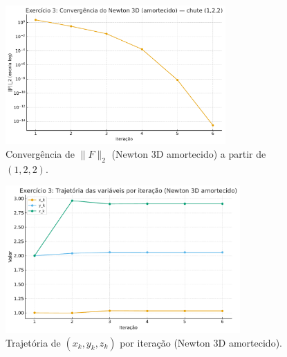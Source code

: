 \documentclass[12pt,a4paper]{article}
\begin{document}
\begin{figure}[H]
  \centering
  \includegraphics[width=0.75\textwidth]{figures/ex3_convergence_normF.pdf}
  \caption{Convergência de $\|F\|_2$ (Newton 3D amortecido) a partir de $(1,2,2)$.}
  \label{fig:ex3_normF}
\end{figure}

\begin{figure}[H]
  \centering
  \includegraphics[width=0.8\textwidth]{figures/ex3_state_trajectory.pdf}
  \caption{Trajetória de $(x_k,y_k,z_k)$ por iteração (Newton 3D amortecido).}
  \label{fig:ex3_state}
\end{figure}
\end{document}
